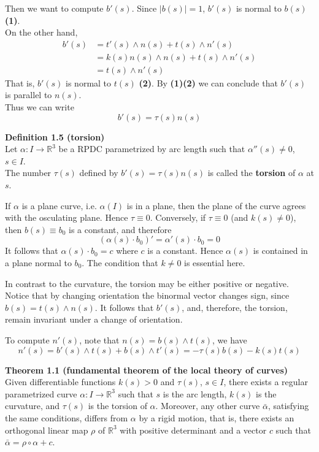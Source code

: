\documentclass{article}
\begin{document}
\par
Then we want to compute $b'(s)$. Since $|b(s)| = 1$, $b'(s)$ is normal to $b(s)$ \textbf{(1)}. \\
On the other hand,
$$
\begin{aligned}
    b'(s) &= t'(s) \land n(s) + t(s) \land n'(s) \\ &= k(s)n(s) \land n(s) + t(s) \land n'(s) \\ &= t(s) \land n'(s)
\end{aligned}
$$
That is, $b'(s)$ is normal to $t(s)$ \textbf{(2)}. By \textbf{(1)(2)} we can conclude that $b'(s)$ is parallel to 
$n(s)$.\\
Thus we can write 
$$
    b'(s) = \tau (s)n(s)
$$

\par
\textbf{Definition 1.5 (torsion)}\\
Let $\alpha: I \to \mathbb R^3$ be a RPDC parametrized by arc length such that $\alpha''(s) \neq 0$, $s \in I$.\\
The number $\tau(s)$ defined by $b'(s) = \tau (s)n(s)$ is called the \textbf{torsion} of $\alpha$ at $s$.

\par
If $\alpha$ is a plane curve, i.e. $\alpha(I)$ is in a plane, then the plane of the curve agrees with the 
osculating plane. Hence $\tau \equiv 0$. Conversely, if $\tau \equiv 0$ (and $k(s) \neq 0$), then $b(s) \equiv b_0$
is a constant, and therefore
$$
(\alpha (s) \cdot b_0)' = \alpha '(s) \cdot b_0 = 0
$$
It follows that $\alpha(s) \cdot b_0 = c$ where $c$ is a constant. Hence $\alpha(s)$ is contained in a plane normal
to $b_0$. The condition that $k \neq 0$ is essential here.

\par
In contrast to the curvature, the torsion may be either positive or negative. Notice that by changing orientation
the binormal vector changes sign, since $b(s) = t(s) \land n(s)$. It follows that $b'(s)$, and, therefore, the
torsion, remain invariant under a change of orientation.

\par
To compute $n'(s)$, note that $n(s) = b(s) \land t(s)$, we have
$$
    n'(s) = b'(s) \land t(s) + b(s) \land t'(s) = -\tau (s)b(s) -k(s)t(s)
$$

\par
\textbf{Theorem 1.1 (fundamental theorem of the local theory of curves)}\\
Given differentiable functions $k(s)>0$ and $\tau (s)$, $s \in I$, there exists a regular parametrized curve
$\alpha:I \to \mathbb R^3$ such that $s$ is the arc length, $k(s)$ is the curvature, and $\tau (s)$ is the torsion
of $\alpha$. Moreover, any other curve $\bar{\alpha}$, satisfying the same conditions, differs from $\alpha$ by a
rigid motion, that is, there exists an orthogonal linear map $\rho$ of $\mathbb R^3$ with positive determinant
and a vector $c$ such that $\bar{\alpha} = \rho \circ \alpha + c$.
\end{document}
